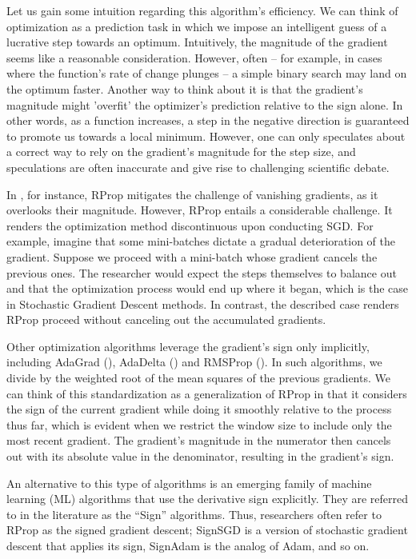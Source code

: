 \documentclass[11pt]{book}
\begin{document}
Let us gain some intuition regarding this algorithm's efficiency.
We can think of optimization as a prediction task in which we impose
an intelligent guess of a lucrative step towards an optimum. Intuitively,
the magnitude of the gradient seems like a reasonable consideration.
However, often -- for example, in cases where the function's rate
of change plunges -- a simple binary search may land on the optimum
faster. Another way to think about it is that the gradient's magnitude
might 'overfit' the optimizer's prediction relative to the sign alone.
In other words, as a function increases, a step in the negative direction
is guaranteed to promote us towards a local minimum. However, one
can only speculates about a correct way to rely on the gradient's
magnitude for the step size, and speculations are often inaccurate
and give rise to challenging scientific debate.

In \cite{behnke2003hierarchical}, for instance, RProp mitigates the
challenge of vanishing gradients, as it overlooks their magnitude.
However, RProp entails a considerable challenge. It renders the optimization
method discontinuous upon conducting SGD. For example, imagine that
some mini-batches dictate a gradual deterioration of the gradient.
Suppose we proceed with a mini-batch whose gradient cancels the previous
ones. The researcher would expect the steps themselves to balance
out and that the optimization process would end up where it began,
which is the case in Stochastic Gradient Descent methods. In contrast,
the described case renders RProp proceed without canceling out the
accumulated gradients.

Other optimization algorithms leverage the gradient's sign only implicitly,
including AdaGrad (\cite{lydia2019adagrad}), AdaDelta (\cite{zeiler2012adadelta})
and RMSProp (\cite{hinton2012neural}). In such algorithms, we divide
by the weighted root of the mean squares of the previous gradients.
We can think of this standardization as a generalization of RProp
in that it considers the sign of the current gradient while doing
it smoothly relative to the process thus far, which is evident when
we restrict the window size to include only the most recent gradient.
The gradient's magnitude in the numerator then cancels out with its
absolute value in the denominator, resulting in the gradient's sign.

An alternative to this type of algorithms is an emerging family of
machine learning (ML) algorithms that use the derivative sign explicitly.
They are referred to in the literature as the ``Sign'' algorithms.
Thus, researchers often refer to RProp as the signed gradient descent;
SignSGD is a version of stochastic gradient descent that applies its
sign, SignAdam is the analog of Adam, and so on.
\end{document}
